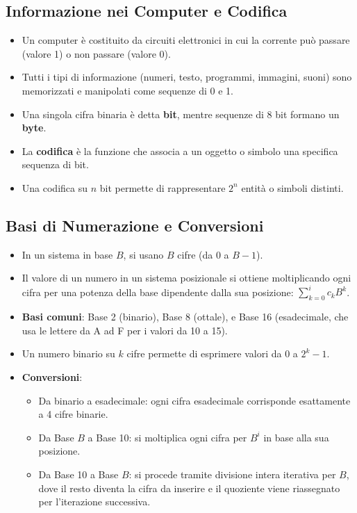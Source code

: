 \documentclass[12pt, a4paper]{article}
\begin{document}
\subsection{Informazione nei Computer e Codifica}

\begin{itemize}
    \item Un computer è costituito da circuiti elettronici in cui la corrente può passare (valore 1) o non passare (valore 0). 
    \item Tutti i tipi di informazione (numeri, testo, programmi, immagini, suoni) sono memorizzati e manipolati come sequenze di 0 e 1. 
    \item Una singola cifra binaria è detta \textbf{bit}, mentre sequenze di 8 bit formano un \textbf{byte}. 
    \item La \textbf{codifica} è la funzione che associa a un oggetto o simbolo una specifica sequenza di bit. 
    \item Una codifica su $n$ bit permette di rappresentare $2^n$ entità o simboli distinti. 
\end{itemize}

\subsection{Basi di Numerazione e Conversioni}

\begin{itemize}
    \item In un sistema in base $B$, si usano $B$ cifre (da $0$ a $B-1$). 
    \item Il valore di un numero in un sistema posizionale si ottiene moltiplicando ogni cifra per una potenza della base dipendente dalla sua posizione: $\sum_{k=0}^{i}c_{k}B^{k}$. 
    \item \textbf{Basi comuni}: Base 2 (binario), Base 8 (ottale), e Base 16 (esadecimale, che usa le lettere da A ad F per i valori da 10 a 15). 
    \item Un numero binario su $k$ cifre permette di esprimere valori da $0$ a $2^k - 1$. 
    \item \textbf{Conversioni}:
    \begin{itemize}
        \item Da binario a esadecimale: ogni cifra esadecimale corrisponde esattamente a 4 cifre binarie. 
        \item Da Base $B$ a Base 10: si moltiplica ogni cifra per $B^i$ in base alla sua posizione. 
        \item Da Base 10 a Base $B$: si procede tramite divisione intera iterativa per $B$, dove il resto diventa la cifra da inserire e il quoziente viene riassegnato per l'iterazione successiva. 
    \end{itemize}
\end{itemize}
\end{document}
